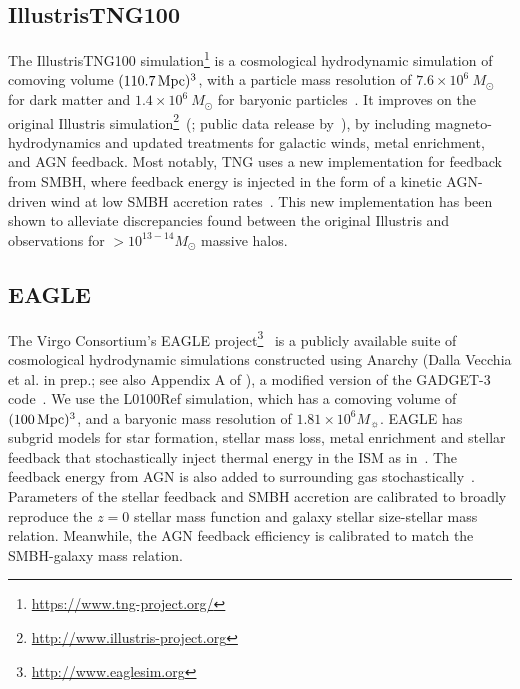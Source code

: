 \subsection{IllustrisTNG100} \label{sec:tng}
The IllustrisTNG100 simulation\footnote{\url{https://www.tng-project.org/}}
is a cosmological hydrodynamic simulation of comoving volume 
$(110.7\,{\rm Mpc})^3$, with a particle mass resolution of $7.6 \times 10^{6}\ M_\odot$ for dark matter and $1.4 \times 10^{6}\ M_\odot$ for baryonic particles~\citep{nelson2018, pillepich2018, springel2018}. It improves on
the original Illustris simulation\footnote{\url{http://www.illustris-project.org}}~(\citealt{vogelsberger2014, genel2014};
public data release by~\citealt{nelson2015}), by including
magneto-hydrodynamics and updated treatments for galactic winds, metal
enrichment, and AGN feedback. Most notably, TNG uses a new implementation for
feedback from SMBH, where feedback energy is injected in the form of a kinetic
AGN-driven wind at low SMBH accretion rates~\citep{weinberger2018}. This new
implementation has been shown to alleviate discrepancies found between the
original Illustris and observations for $> 10^{13-14} M_\odot$ massive halos. 

\subsection{EAGLE} \label{sec:eagle} 
The Virgo Consortium's EAGLE
project\footnote{\url{http://www.eaglesim.org}}~\citep{schaye2015, crain2015,
mcalpine2016} is a publicly available suite of cosmological hydrodynamic
simulations constructed using {\sc Anarchy} (Dalla Vecchia et al. in prep.; 
see also Appendix A of \citealt{schaye2015}), a modified version of the 
{\sc GADGET-3} code~\citep{springel2005}. We use the L0100Ref simulation,
which has a comoving volume of $(100\,{\rm Mpc})^3$, and a baryonic mass resolution of $1.81\times 10^6M_{\sun}$. %
EAGLE has subgrid models for star formation, stellar mass loss, metal enrichment
and stellar feedback that stochastically inject thermal energy in the ISM as
in~\citep{dallavecchia2012}. The feedback energy from AGN is also added to
surrounding gas stochastically~\citep{booth2009}. Parameters of the stellar 
feedback and SMBH accretion are calibrated to broadly reproduce the $z=0$ 
stellar mass function and galaxy stellar size-stellar mass relation. Meanwhile, 
the AGN feedback efficiency is calibrated to match the SMBH-galaxy mass relation. 

